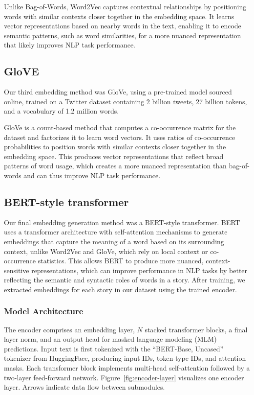 \documentclass{article}
\begin{document}
Unlike Bag-of-Words, Word2Vec captures contextual relationships by positioning words with similar contexts closer together in the embedding space. It learns vector representations based on nearby words in the text, enabling it to encode semantic patterns, such as word similarities, for a more nuanced representation that likely improves NLP task performance.

\subsection{GloVE}

Our third embedding method was GloVe, using a pre-trained model sourced online, trained on a Twitter dataset containing 2 billion tweets, 27 billion tokens, and a vocabulary of 1.2 million words.

GloVe is a count-based method that computes a co-occurrence matrix for the dataset and factorizes it to learn word vectors. It uses ratios of co-occurrence probabilities to position words with similar contexts closer together in the embedding space. This produces vector representations that reflect broad patterns of word usage, which creates a more nuanced representation than bag-of-words and can thus improve NLP task performance.

\subsection{BERT-style transformer}


Our final embedding generation method was a BERT-style transformer. BERT uses a transformer architecture with self-attention mechanisms to generate embeddings that capture the meaning of a word based on its surrounding context, unlike Word2Vec and GloVe, which rely on local context or co-occurrence statistics. This allows BERT to produce more nuanced, context-sensitive representations, which can improve performance in NLP tasks by better reflecting the semantic and syntactic roles of words in a story. After training, we extracted embeddings for each story in our dataset using the trained encoder.


\subsubsection{Model Architecture}

The encoder comprises an embedding layer, $N$ stacked transformer blocks, a final layer norm, and an output head for masked language modeling (MLM) predictions. Input text is first tokenized with the “BERT-Base, Uncased” tokenizer from HuggingFace, producing input IDs, token-type IDs, and attention masks. Each transformer block implements multi-head self-attention followed by a two-layer feed-forward network. Figure~\ref{fig:encoder-layer} visualizes one encoder layer. Arrows indicate data flow between submodules.
\end{document}
